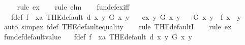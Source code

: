 \begin{isabellebody}
\ \ \ \isamarkupfalse%
\ {\isacharparenleft}{\kern0pt}rule\ ex{}{\isacharparenright}{\kern0pt}\isanewline
\ \ \isamarkupfalse%
\ {\isacharparenleft}{\kern0pt}rule\ elm{\isacharparenright}{\kern0pt}\isanewline
\ \ \isamarkupfalse%
%
\endisatagproof
{\isafoldproof}%
%
\isadelimproof
\isanewline
%
\endisadelimproof
\isanewline
{}\isamarkupfalse%
\ fundef{\isacharunderscore}{\kern0pt}ex{}{\isacharunderscore}{\kern0pt}iff{\isacharcolon}{\kern0pt}\isanewline
\ \ \ f{\isacharunderscore}{\kern0pt}def{\isacharcolon}{\kern0pt}\ {\isachardoublequoteopen}f\ {\isasymequiv}\ {\isacharparenleft}{\kern0pt}{\isasymlambda}x{\isacharcolon}{\kern0pt}{\isacharcolon}{\kern0pt}{\isacharprime}{\kern0pt}a{\isachardot}{\kern0pt}\ THE{\isacharunderscore}{\kern0pt}default\ {\isacharparenleft}{\kern0pt}d\ x{\isacharparenright}{\kern0pt}\ {\isacharparenleft}{\kern0pt}{\isasymlambda}y{\isachardot}{\kern0pt}\ G\ x\ y{\isacharparenright}{\kern0pt}{\isacharparenright}{\kern0pt}{\isachardoublequoteclose}\isanewline
\ \ \ ex{}{\isacharcolon}{\kern0pt}\ {\isachardoublequoteopen}{\isasymexists}{\isacharbang}{\kern0pt}y{\isachardot}{\kern0pt}\ G\ x\ y{\isachardoublequoteclose}\isanewline
\ \ \ {\isachardoublequoteopen}{\isacharparenleft}{\kern0pt}G\ x\ y{\isacharparenright}{\kern0pt}\ {\isacharequal}{\kern0pt}\ {\isacharparenleft}{\kern0pt}f\ x\ {\isacharequal}{\kern0pt}\ y{\isacharparenright}{\kern0pt}{\isachardoublequoteclose}\isanewline
%
\isadelimproof
\ \ %
\endisadelimproof
%
\isatagproof
{}\isamarkupfalse%
\ {\isacharparenleft}{\kern0pt}auto\ simp{\isacharcolon}{\kern0pt}ex{}\ f{\isacharunderscore}{\kern0pt}def\ THE{\isacharunderscore}{\kern0pt}default{}{\isacharunderscore}{\kern0pt}equality{\isacharparenright}{\kern0pt}\isanewline
\ \ \isamarkupfalse%
\ {\isacharparenleft}{\kern0pt}rule\ THE{\isacharunderscore}{\kern0pt}defaultI{\isacharprime}{\kern0pt}{\isacharparenright}{\kern0pt}\isanewline
\ \ \isamarkupfalse%
\ {\isacharparenleft}{\kern0pt}rule\ ex{}{\isacharparenright}{\kern0pt}\isanewline
\ \ \isamarkupfalse%
%
\endisatagproof
{\isafoldproof}%
%
\isadelimproof
\isanewline
%
\endisadelimproof
\isanewline
{}\isamarkupfalse%
\ fundef{\isacharunderscore}{\kern0pt}default{\isacharunderscore}{\kern0pt}value{\isacharcolon}{\kern0pt}\isanewline
\ \ \ f{\isacharunderscore}{\kern0pt}def{\isacharcolon}{\kern0pt}\ {\isachardoublequoteopen}f\ {\isasymequiv}\ {\isacharparenleft}{\kern0pt}{\isasymlambda}x{\isacharcolon}{\kern0pt}{\isacharcolon}{\kern0pt}{\isacharprime}{\kern0pt}a{\isachardot}{\kern0pt}\ THE{\isacharunderscore}{\kern0pt}default\ {\isacharparenleft}{\kern0pt}d\ x{\isacharparenright}{\kern0pt}\ {\isacharparenleft}{\kern0pt}{\isasymlambda}y{\isachardot}{\kern0pt}\ G\ x\ y{\isacharparenright}{\kern0pt}{\isacharparenright}{\kern0pt}{\isachardoublequoteclose}\isanewline

\end{isabellebody}
